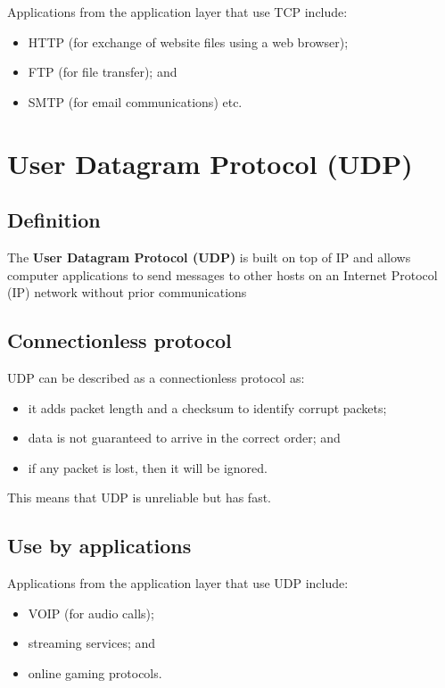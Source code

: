 \documentclass[a4paper]{systems-software}
\begin{document}
Applications from the application layer that use TCP include:
\begin{itemize}
	\item HTTP (for exchange of website files using a web browser);
	\item FTP (for file transfer); and
	\item SMTP (for email communications) etc.
\end{itemize}


\section*{User Datagram Protocol (UDP)}

\subsection*{Definition}

The \textbf{User Datagram Protocol (UDP)} is built on top of IP and allows computer applications to send messages to other hosts on an Internet Protocol (IP) network without prior communications


\subsection*{Connectionless protocol}

UDP can be described as a connectionless protocol as:
\begin{itemize}
	\item it adds packet length and a checksum to identify corrupt packets;
	\item data is not guaranteed to arrive in the correct order; and
	\item if any packet is lost, then it will be ignored.
\end{itemize}

This means that UDP is unreliable but has fast.


\subsection*{Use by applications}

Applications from the application layer that use UDP include:
\begin{itemize}
	\item VOIP (for audio calls);
	\item streaming services; and
	\item online gaming protocols.
\end{itemize}
\end{document}

